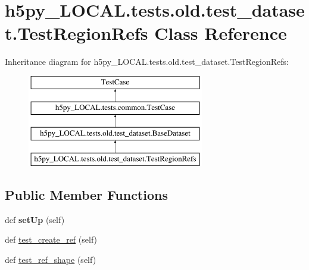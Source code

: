 \hypertarget{classh5py__LOCAL_1_1tests_1_1old_1_1test__dataset_1_1TestRegionRefs}{}\section{h5py\+\_\+\+L\+O\+C\+A\+L.\+tests.\+old.\+test\+\_\+dataset.\+Test\+Region\+Refs Class Reference}
\label{classh5py__LOCAL_1_1tests_1_1old_1_1test__dataset_1_1TestRegionRefs}
Inheritance diagram for h5py\+\_\+\+L\+O\+C\+A\+L.\+tests.\+old.\+test\+\_\+dataset.\+Test\+Region\+Refs\+:\begin{figure}[H]
\begin{center}
\leavevmode
\includegraphics[height=4.000000cm]{classh5py__LOCAL_1_1tests_1_1old_1_1test__dataset_1_1TestRegionRefs}
\end{center}
\end{figure}
\subsection*{Public Member Functions}
\begin{DoxyCompactItemize}
\item 
\mbox{\label{classh5py__LOCAL_1_1tests_1_1old_1_1test__dataset_1_1TestRegionRefs_ac5409fe9ef5751ff5957a6ebc66bf488}} 
def {\bfseries set\+Up} (self)
\item 
def \hyperlink{classh5py__LOCAL_1_1tests_1_1old_1_1test__dataset_1_1TestRegionRefs_aac8fa998eea2871ebcaf8803714a0995}{test\+\_\+create\+\_\+ref} (self)
\item 
def \hyperlink{classh5py__LOCAL_1_1tests_1_1old_1_1test__dataset_1_1TestRegionRefs_a8d476ade9d6feea1db6b2bf3645bf60d}{test\+\_\+ref\+\_\+shape} (self)
\end{DoxyCompactItemize}
